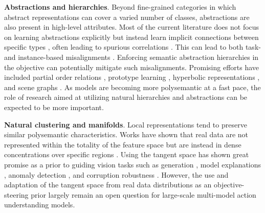 \noindent
\textbf{Abstractions and hierarchies}. Beyond fine-grained categories in which abstract representations can cover a varied number of classes, abstractions are also present in high-level attributes. Most of the current literature does not focus on learning abstractions explicitly but instead learn implicit connections between specific types \citep{li2024deal}, often leading to spurious correlations \citep{chen2020counterfactual,kim2023exposing,tian2024argue}. This can lead to both task- and instance-based misalignments \citep{zhang2024rethinking}. Enforcing semantic abstraction hierarchies in the objective can potentially mitigate such misalignments. Promising efforts have included partial order relations \citep{alper2024emergent},  prototype learning \citep{ramesh2022hierarchical}, hyperbolic representations \citep{mettes2024hyperbolic}, and scene graphs \citep{li2024scene}. As models are becoming more polysemantic at a fast pace, the role of research aimed at utilizing natural hierarchies and abstractions can be expected to be more important.

\noindent
\textbf{Natural clustering and manifolds}. Local representations tend to preserve similar polysemantic characteristics. Works have shown that real data are not represented within the totality of the feature space but are instead in dense concentrations over specific regions \citep{genovese2012minimax,jiang2018trust,liang2022mind}. Using the tangent space has shown great promise as a prior to guiding vision tasks such as generation \citep{he2023manifold}, model explanations \citep{bordt2023manifold}, anomaly detection \citep{shin2023anomaly}, and corruption robustness \citep{chen2022vita}. However, the use and adaptation of the tangent space from real data distributions as an objective-steering prior largely remain an open question for large-scale multi-model action understanding models. 





